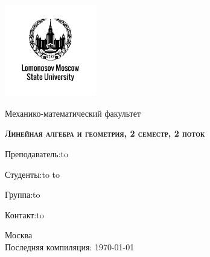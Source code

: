 \begin{titlepage}
  \newpage
  \begin{center}
  \includegraphics[width=4cm]{image/image.png}
  \end{center}
  \vspace{4em}
  
  \begin{center}
  \Large Механико-математический факультет  
  \end{center}
  \vspace{2em}
  
  \begin{center}
  \large{\textsc{\textbf{Линейная алгебра и геометрия, 2 семестр, 2 поток}}}
  \end{center}
  \vspace{6em}
  
  \newbox{\lbox}
  \newlength{\maxl}
  \setlength{\maxl}{\wd\lbox}
  \hfill\parbox{11cm}
  {
  Преподаватель:\hfill\hbox to\vspace{0.5cm}
  
  Студенты:\hfill\hbox to\vspace{0.15cm}
  \tab\hfill\hbox to\vspace{0.5cm}

  Группа:\hfill\hbox to\vspace{0.5cm}
  
  Контакт:\hfill\hbox to\vspace{0.5cm}
  }

  \vspace{\fill}
  \begin{center}
  Москва \\Последняя компиляция: \today
  \end{center}
  
\end{titlepage}